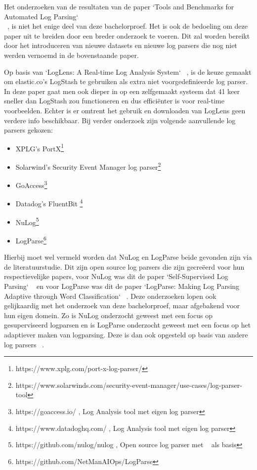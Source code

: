 Het onderzoeken van de resultaten van de paper `Tools and Benchmarks for Automated Log Parsing`\\ ~\autocite{TBA2019}, is niet het enige deel van deze bachelorproef. Het is ook de bedoeling om deze paper uit te breiden door een breder onderzoek te voeren. Dit zal worden bereikt door het introduceren van nieuwe datasets en nieuwe log parsers die nog niet werden vernoemd in de bovenstaande paper.

Op basis van `LogLens: A Real-time Log Analysis System` ~\autocite{LogLens2018}, is de keuze gemaakt om elastic.co's LogStash te gebruiken als extra niet voorgedefinieerde log parser. In deze paper gaat men ook dieper in op een zelfgemaakt systeem dat 41 keer sneller dan LogStash zou functioneren en dus efficiënter is voor real-time voorbeelden. Echter is er omtrent het gebruik en downloaden van LogLens geen verdere info beschikbaar.
Bij verder onderzoek zijn volgende aanvullende log parsers gekozen:

\begin{itemize}
    \item XPLG's PortX\footnote{https://www.xplg.com/port-x-log-parser/}
    \item Solarwind's Security Event Manager log parser\footnote{https://www.solarwinds.com/security-event-manager/use-cases/log-parser-tool}
    \item  GoAccess\footnote{https://goaccess.io/ , Log Analysis tool met eigen log parser}
    \item  Datadog's FluentBit \footnote{https://www.datadoghq.com/ , Log Analysis tool met eigen log parser}
    \item NuLog\footnote{https://github.com/nulog/nulog , Open source log parser met ~\autocite{TBA2019} als basis}
    \item LogParse\footnote{https://github.com/NetManAIOps/LogParse}
\end{itemize}

Hierbij moet wel vermeld worden dat NuLog en LogParse beide gevonden zijn via de literatuurstudie. Dit zijn open source log parsers die zijn gecreëerd voor hun respectievelijke papers, voor NuLog was dit de paper `Self-Supervised Log Parsing` ~\autocite{SSLP2020} en voor LogParse was dit de paper `LogParse: Making Log Parsing Adaptive through Word Classification` ~\autocite{LogParse2020}.
Deze onderzoeken lopen ook gelijkaardig met het onderzoek van deze bachelorproef, maar afgebakend voor hun eigen domein. Zo is NuLog onderzocht geweest met een focus op gesuperviseerd logparsen en is LogParse onderzocht geweest met een focus op het adaptiever maken van logparsing. Deze is dan ook opgesteld op basis van andere log parsers ~\autocite{LogParse2020}.


